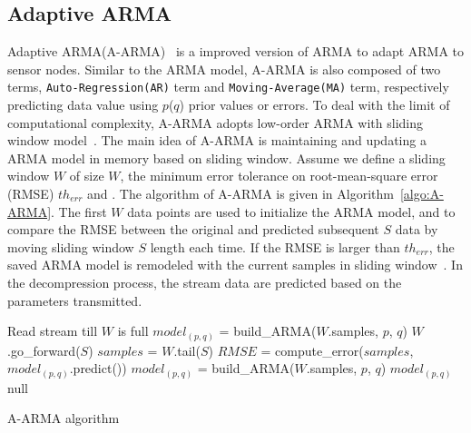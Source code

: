 \subsection{Adaptive ARMA}

Adaptive ARMA(A-ARMA)~\cite{lu2010optimized} is a improved version of ARMA
 to
adapt ARMA to sensor nodes. Similar to the ARMA model, A-ARMA is also composed of
two terms, \texttt{Auto-Regression(AR)} term and \texttt{Moving-Average(MA)}
term, respectively predicting data value using $p$($q$) prior values or errors.
To deal with the limit of computational complexity, A-ARMA adopts low-order ARMA
with sliding window model~\cite{lu2010optimized}. The main idea of A-ARMA is
maintaining and updating a ARMA model in memory based on sliding window. Assume
we define a sliding window $W$ of size $W$, the minimum error tolerance on
root-mean-square error (RMSE) $th_{err}$ and . The algorithm of A-ARMA is given in Algorithm~\ref{algo:A-ARMA}. The first
$W$ data points are used to initialize the ARMA model, and to compare the RMSE between the
original and predicted subsequent $S$ data by moving sliding window $S$ length
each time. If the RMSE is larger than $th_{err}$, the saved ARMA model is
remodeled with the current samples in sliding window~\cite{lu2010optimized}. In the
decompression process, the stream data are predicted based on the parameters
transmitted.


\begin{algorithm}
\begin{algorithmic}[1]
\Input
\EndInput
\Output
\EndOutput

\State Read stream till $W$ is full 
\State $model_{(p, q)}$ = build\_ARMA($W$.samples, $p$, $q$)  
    \State $W$.go\_forward($S$) 
    \State $samples$ = $W$.tail($S$)    
    \State $RMSE$ = compute\_error($samples$,  $model_{(p, q)}$.predict())
        \State $model_{(p, q)}$ = build\_ARMA($W$.samples, $p$, $q$)
        \State \Return $model_{(p, q)}$ 
    \Else
        \State \Return null 
    \EndIf
\EndWhile
\end{algorithmic}
\caption{A-ARMA algorithm}
\label{algo:A-ARMA}
\end{algorithm}

